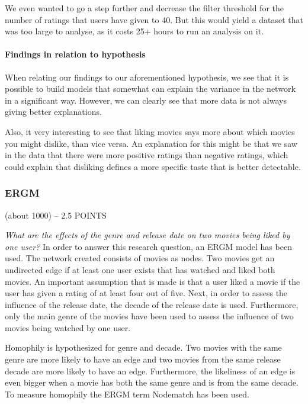 \documentclass[
  english,
  man,floatsintext]{apa6}
\let\oldparagraph\paragraph
\renewcommand{\paragraph}[1]{\oldparagraph{#1}\mbox{}}
\begin{document}
We even wanted to go a step further and decrease the filter threshold for the number of ratings that users have given to 40. But this would yield a dataset that was too large to analyse, as it costs 25+ hours to run an analysis on it.

\hypertarget{findings-in-relation-to-hypothesis}{%
\paragraph{Findings in relation to hypothesis}\label{findings-in-relation-to-hypothesis}}

When relating our findings to our aforementioned hypothesis, we see that it is possible to build models that somewhat can explain the variance in the network in a significant way. However, we can clearly see that more data is not always giving better explanations.

Also, it very interesting to see that liking movies says more about which movies you might dislike, than vice versa. An explanation for this might be that we saw in the data that there were more positive ratings than negative ratings, which could explain that disliking defines a more specific taste that is better detectable.

\hypertarget{ergm-1}{%
\subsubsection{ERGM}\label{ergm-1}}

(about 1000) -- 2.5 POINTS

\emph{What are the effects of the genre and release date on two movies being liked by one user?}
In order to answer this research question, an ERGM model has been used. The network created consists of movies as nodes. Two movies get an undirected edge if at least one user exists that has watched and liked both movies. An important assumption that is made is that a user liked a movie if the user has given a rating of at least four out of five. Next, in order to assess the influence of the release date, the decade of the release date is used. Furthermore, only the main genre of the movies have been used to assess the influence of two movies being watched by one user.

Homophily is hypothesized for genre and decade. Two movies with the same genre are more likely to have an edge and two movies from the same release decade are more likely to have an edge. Furthermore, the likeliness of an edge is even bigger when a movie has both the same genre and is from the same decade. To measure homophily the ERGM term Nodematch has been used.
\end{document}

